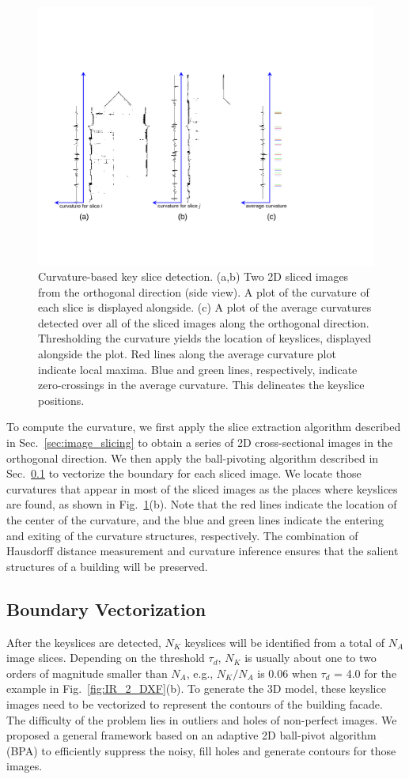 \documentclass[10pt,journal,cspaper,compsoc]{IEEEtran}
\newcommand{\Sec}[1]{Sec.~\ref{sec:#1}}
\newcommand{\Figb}[1]{Fig.~\ref{fig:#1}(b)}
\begin{document}
\begin{figure}[htbp]
\centerline{\includegraphics[width=.5\textwidth]{curvature_comp.pdf}}
\caption{Curvature-based key slice detection.
(a,b) Two 2D sliced images from the orthogonal direction (side view).
A plot of the curvature of each slice is displayed alongside.
(c) A plot of the average curvatures detected over all of the sliced
images along the orthogonal direction.
Thresholding the curvature yields the location of keyslices, displayed
alongside the plot.
Red lines along the average curvature plot indicate local maxima.
Blue and green lines, respectively, indicate zero-crossings in the
average curvature.
This delineates the keyslice positions.
}
\label{fig:HT_BPA_Curvature}
\end{figure}

To compute the curvature, we first apply the slice extraction algorithm
described in \Sec{image_slicing} to obtain a series of 2D cross-sectional
images in the orthogonal direction.
We then apply the ball-pivoting algorithm described in \Sec{BPA} to
vectorize the boundary for each sliced image.
We locate those curvatures that appear in most of the sliced images as the
places where keyslices are found, as shown in \Figb{HT_BPA_Curvature}.
Note that the red lines indicate the location of the center of the curvature,
and the blue and green lines indicate the entering and exiting of the
curvature structures, respectively.
The combination of Hausdorff distance measurement and curvature inference
ensures that the salient structures of a building will be preserved.

\subsection{Boundary Vectorization}
\label{sec:BPA}

After the keyslices are detected, 
$N_K$ keyslices will be identified from a total of $N_A$ image slices.
Depending on the threshold $\tau_d$, 
$N_K$ is usually about one to two orders of magnitude smaller than $N_A$, 
e.g., $N_K/N_A$ is 0.06 when $\tau_d$ = 4.0 
for the example in \Figb{IR_2_DXF}.
To generate the 3D model, 
these keyslice images need to be vectorized to
represent the contours of the building facade.
The difficulty of the problem lies in outliers and holes of non-perfect images.
We proposed a general framework based on an adaptive 2D ball-pivot algorithm (BPA) 
 to efficiently suppress the noisy, 
fill holes and 
generate contours for those images.
\end{document}
